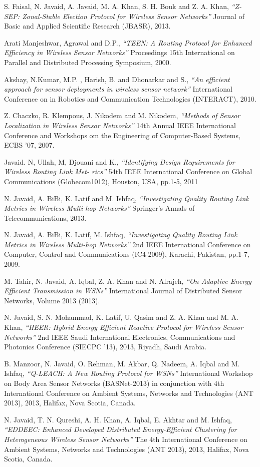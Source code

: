 \documentclass[journal]{IEEEtran}
\begin{document}
\begin{thebibliography}{1}
 S. Faisal, N. Javaid, A. Javaid, M. A. Khan, S. H. Bouk and Z. A. Khan, {\em ``Z-SEP: Zonal-Stable Election Protocol for Wireless Sensor Networks''} Journal of Basic and Applied Scientific Research (JBASR), 2013.

 Arati Manjeshwar, Agrawal and D.P., {\em ``TEEN: A Routing Protocol for Enhanced Efficiency in Wireless Sensor Networks'' } Proceedings 15th International on Parallel and Distributed Processing Symposium, 2000.

 Akshay, N.Kumar, M.P. , Harish, B. and Dhonarkar and S., {\em ``An efficient approach for sensor deployments in wireless sensor network''} International Conference on in Robotics and Communication Technologies (INTERACT), 2010.

 Z. Chaczko, R. Klempous, J. Nikodem and M. Nikodem, {\em ``Methods of Sensor Localization in Wireless Sensor Networks''} 14th Annual IEEE International Conference and Workshops om the Engineering of Computer-Based Systems, ECBS '07, 2007.

 Javaid. N, Ullah, M, Djouani and K., {\em ``Identifying Design Requirements for Wireless Routing Link Met- rics''} 54th IEEE International Conference on Global Communications (Globecom1012), Houston, USA, pp.1-5, 2011

 N. Javaid, A. BiBi, K. Latif and M. Ishfaq, {\em ``Investigating Quality Routing Link Metrics in Wireless Multi-hop Networks''} Springer's Annals of Telecommunications, 2013.

 N. Javaid, A. BiBi, K. Latif, M. Ishfaq, {\em ``Investigating Quality Routing Link Metrics in Wireless Multi-hop Networks''} 2nd IEEE International Conference on Computer, Control and Communications (IC4-2009), Karachi, Pakistan, pp.1-7, 2009.

 M. Tahir, N. Javaid, A. Iqbal, Z. A. Khan and N. Alrajeh, {\em ``On Adaptive Energy Efficient Transmission in WSNs''} International Journal of Distributed Sensor Networks, Volume 2013 (2013).

 N. Javaid, S. N. Mohammad, K. Latif, U. Qasim and Z. A. Khan and M. A. Khan, {\em ``HEER: Hybrid Energy Efficient Reactive Protocol for Wireless Sensor Networks''} 2nd IEEE Saudi International Electronics, Communications and Photonics Conference (SIECPC ’13), 2013, Riyadh, Saudi Arabia.

 B. Manzoor, N. Javaid, O. Rehman, M. Akbar, Q. Nadeem, A. Iqbal and M. Ishfaq, {\em ``Q-LEACH: A New Routing Protocol for WSNs''} International Workshop on Body Area Sensor Networks (BASNet-2013) in conjunction with 4th International Conference on Ambient Systems, Networks and Technologies (ANT 2013), 2013, Halifax, Nova Scotia, Canada.

 N. Javaid, T. N. Qureshi, A. H. Khan, A. Iqbal, E. Akhtar and M. Ishfaq, {\em ``EDDEEC: Enhanced Developed Distributed Energy-Efficient Clustering for Heterogeneous Wireless Sensor Networks''} The 4th International Conference on Ambient Systems, Networks and Technologies (ANT 2013), 2013, Halifax, Nova Scotia, Canada.

     \end{thebibliography}
\end{document}
